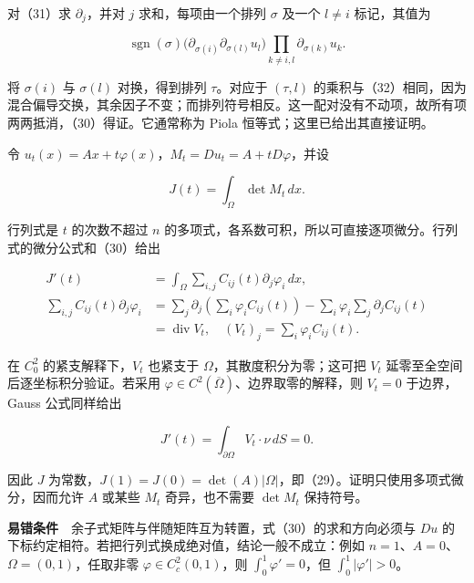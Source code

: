 \documentclass[11pt,a4paper]{article}
\begin{document}
对（31）求 \(\partial_j\)，并对 \(j\) 求和，每项由一个排列 \(\sigma\)
及一个 \(l\ne i\) 标记，其值为

\begin{equation}
\operatorname{sgn}(\sigma)
\big(\partial_{\sigma(i)}\partial_{\sigma(l)}u_l\big)
\prod_{k\ne i,l}\partial_{\sigma(k)}u_k.
\tag{32}
\end{equation}

将 \(\sigma(i)\) 与 \(\sigma(l)\) 对换，得到排列 \(\tau\)。对应于
\((\tau,l)\)
的乘积与（32）相同，因为混合偏导交换，其余因子不变；而排列符号相反。这一配对没有不动项，故所有项两两抵消，（30）得证。它通常称为
Piola 恒等式；这里已给出其直接证明。

令 \(u_t(x)=Ax+t\varphi(x)\)，\(M_t=Du_t=A+tD\varphi\)，并设

\begin{equation}
J(t)=\int_\Omega\det M_t\,dx.
\tag{33}
\end{equation}

行列式是 \(t\) 的次数不超过 \(n\)
的多项式，各系数可积，所以可直接逐项微分。行列式的微分公式和（30）给出

\begin{equation}
\begin{aligned}
J'(t)&=\int_\Omega\sum_{i,j}C_{ij}(t)\partial_j\varphi_i\,dx,\\
\sum_{i,j}C_{ij}(t)\partial_j\varphi_i
&=\sum_j\partial_j\left(\sum_i\varphi_i C_{ij}(t)\right)
-\sum_i\varphi_i\sum_j\partial_j C_{ij}(t)\\
&=\operatorname{div}V_t,
\quad (V_t)_j=\sum_i\varphi_i C_{ij}(t).
\end{aligned}
\tag{34}
\end{equation}

在 \(C_0^2\) 的紧支解释下，\(V_t\) 也紧支于
\(\Omega\)，其散度积分为零；这可把 \(V_t\)
延零至全空间后逐坐标积分验证。若采用
\(\varphi\in C^2(\overline\Omega)\)、边界取零的解释，则 \(V_t=0\)
于边界，Gauss 公式同样给出

\begin{equation}
J'(t)=\int_{\partial\Omega}V_t\cdot\nu\,dS=0.
\tag{35}
\end{equation}

因此 \(J\)
为常数，\(J(1)=J(0)=\det(A)|\Omega|\)，即（29）。证明只使用多项式微分，因而允许
\(A\) 或某些 \(M_t\) 奇异，也不需要 \(\det M_t\) 保持符号。

\textbf{易错条件}　余子式矩阵与伴随矩阵互为转置，式（30）的求和方向必须与
\(Du\) 的下标约定相符。若把行列式换成绝对值，结论一般不成立：例如
\(n=1\)、\(A=0\)、\(\Omega=(0,1)\)，任取非零
\(\varphi\in C_c^2(0,1)\)，则 \(\int_0^1\varphi'=0\)，但
\(\int_0^1|\varphi'|>0\)。
\end{document}

